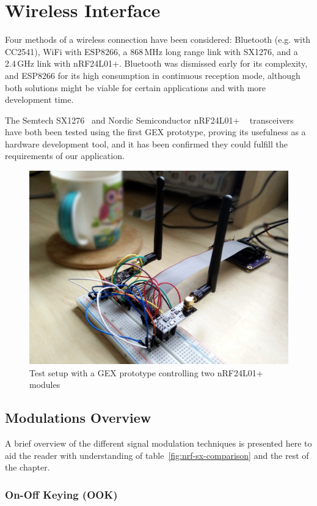 \chapter{Wireless Interface} \label{sec:wireless}

Four methods of a wireless connection have been considered: Bluetooth (e.g. with CC2541), WiFi with ESP8266, a 868\,MHz long range link with SX1276, and a 2.4\,GHz link with nRF24L01+. Bluetooth was dismissed early for its complexity, and ESP8266 for its high consumption in continuous reception mode, although both solutions might be viable for certain applications and with more development time.

The Semtech SX1276~\cite{semtech-manual} and Nordic Semiconductor nRF24L01+ ~\cite{nrf-manual} transceivers have both been tested using the first GEX prototype, proving its usefulness as a hardware development tool, and it has been confirmed they could fulfill the requirements of our application.

\begin{figure}[h]
	\centering
	\includegraphics[width=.7\textwidth]{img/nrf-testing.jpg}
	\caption{Test setup with a GEX prototype controlling two nRF24L01+ modules}
\end{figure}

\section{Modulations Overview}

A brief overview of the different signal modulation techniques is presented here to aid the reader with understanding of table~\ref{fig:nrf-sx-comparison} and the rest of the chapter.

\subsection{On-Off Keying (OOK)}

